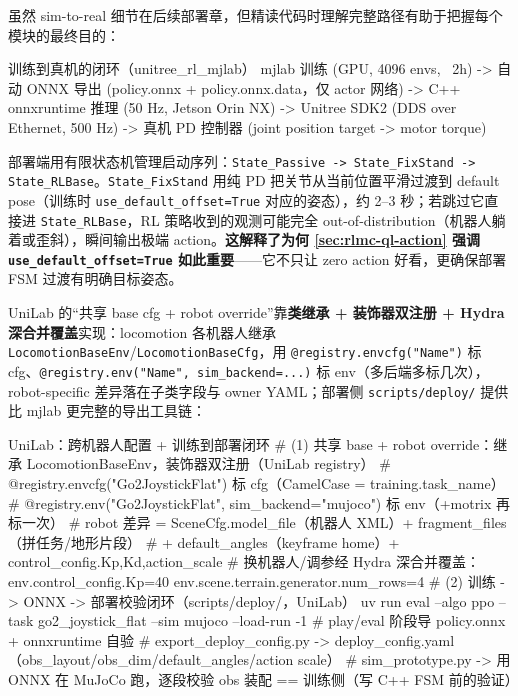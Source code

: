 虽然 sim-to-real 细节在后续部署章，但精读代码时理解完整路径有助于把握每个模块的最终目的：

\begin{codebox}{训练到真机的闭环（unitree\_rl\_mjlab）}
mjlab 训练 (GPU, 4096 envs, ~2h)
  -> 自动 ONNX 导出 (policy.onnx + policy.onnx.data，仅 actor 网络)
  -> C++ onnxruntime 推理 (50 Hz, Jetson Orin NX)
  -> Unitree SDK2 (DDS over Ethernet, 500 Hz)
  -> 真机 PD 控制器 (joint position target -> motor torque)
\end{codebox}

部署端用有限状态机管理启动序列：\verb|State_Passive -> State_FixStand -> State_RLBase|。\verb|State_FixStand| 用纯 PD 把关节从当前位置平滑过渡到 default pose（训练时 \verb|use_default_offset=True| 对应的姿态），约 2--3 秒；若跳过它直接进 \verb|State_RLBase|，RL 策略收到的观测可能完全 out-of-distribution（机器人躺着或歪斜），瞬间输出极端 action。\textbf{这解释了为何 \cref{sec:rlmc-ql-action} 强调 \texttt{use\_default\_offset=True} 如此重要}——它不只让 zero action 好看，更确保部署 FSM 过渡有明确目标姿态。

UniLab 的“共享 base cfg + robot override”靠\textbf{类继承 + 装饰器双注册 + Hydra 深合并覆盖}实现：locomotion 各机器人继承 \verb|LocomotionBaseEnv|/\verb|LocomotionBaseCfg|，用 \verb|@registry.envcfg("Name")| 标 cfg、\verb|@registry.env("Name", sim_backend=...)| 标 env（多后端多标几次），robot-specific 差异落在子类字段与 owner YAML；部署侧 \verb|scripts/deploy/| 提供比 mjlab 更完整的导出工具链：

\begin{codebox}[bash]{UniLab：跨机器人配置 + 训练到部署闭环}
# (1) 共享 base + robot override：继承 LocomotionBaseEnv，装饰器双注册（UniLab registry）
#   @registry.envcfg("Go2JoystickFlat")  标 cfg（CamelCase = training.task_name）
#   @registry.env("Go2JoystickFlat", sim_backend="mujoco")  标 env（+motrix 再标一次）
#   robot 差异 = SceneCfg.model_file（机器人 XML）+ fragment_files（拼任务/地形片段）
#               + default_angles（keyframe home）+ control_config.{Kp,Kd,action_scale}
#   换机器人/调参经 Hydra 深合并覆盖：env.control_config.Kp=40 env.scene.terrain.generator.num_rows=4
# (2) 训练 -> ONNX -> 部署校验闭环（scripts/deploy/，UniLab）
uv run eval --algo ppo --task go2_joystick_flat --sim mujoco --load-run -1  # play/eval 阶段导 policy.onnx + onnxruntime 自验
#   export_deploy_config.py  -> deploy_config.yaml（obs_layout/obs_dim/default_angles/action scale）
#   sim_prototype.py         -> 用 ONNX 在 MuJoCo 跑，逐段校验 obs 装配 == 训练侧（写 C++ FSM 前的验证）
\end{codebox}

